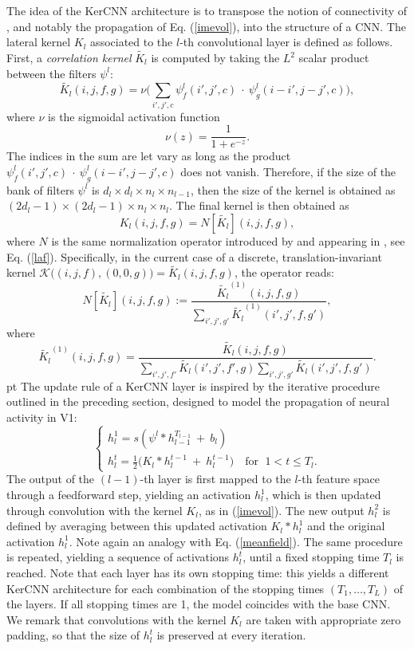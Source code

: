 \documentclass[11pt,oneside,reqno]{amsart}
\begin{document}
 The idea of the KerCNN architecture is to transpose the notion of connectivity of \citet{neuro,metric}, and notably the propagation of Eq. (\ref{imevol}), into the structure of a CNN. The lateral kernel $K_l$ associated to the $l$-th convolutional layer is defined as follows. First, a \emph{correlation kernel} $\tilde{K_l}$ is computed by taking the $L^2$ scalar product between the filters $\psi^l$:
 \begin{equation}\label{initK}
  \tilde{K_l}(i,j,f,g) = \nu\Big(\sum_{i',j',c} \psi^l_f(i',j',c)\: \cdot \: \psi^l_g(i-i',j-j',c)\Big),
 \end{equation}
 where $\nu$ is the sigmoidal activation function
 \[\nu(z) = \frac{1}{1+e^{-z}}.\]
 The indices in the sum are let vary as long as the product $\psi^l_f(i',j',c)\: \cdot \: \psi^l_g(i-i',j-j',c)$ does not vanish. Therefore, if the size of the bank of filters $\psi^l$ is $d_l \times d_l \times n_l \times n_{l-1}$, then the size of the kernel is obtained as $(2d_l-1)\times(2d_l-1)\times n_l \times n_l$.
 The final kernel is then obtained as
 \[K_l(i,j,f,g) = N[\tilde{K_l}](i,j,f,g),\]
 where $N$ is the same normalization operator introduced by \citet{coiflaf} and appearing in \citet{neuro}, see Eq. (\ref{laf}). Specifically, in the current case of a discrete, translation-invariant kernel $\mathcal{K}\big( (i,j,f),(0,0,g) \big) = \tilde{K_l}(i,j,f,g)$, the operator reads:
 \[N[\tilde{K_l}](i,j,f,g) := \frac{\tilde{K_l}^{(1)}(i,j,f,g)}{\sum_{i',j',g'} \tilde{K_l}^{(1)}(i',j',f,g')},\]
  where
  \[\tilde{K_l}^{(1)}(i,j,f,g) = \frac{\tilde{K_l}(i,j,f,g)}{\sum_{i',j',f'} \tilde{K_l}(i',j',f',g) \sum_{i',j',g'} \tilde{K_l}(i',j',f,g')}.\]
   pt
  The update rule of a KerCNN layer is inspired by the iterative procedure outlined in the preceding section, designed to model the propagation of neural activity in V1:
  \begin{equation}\label{kcnnrule} \begin{cases}h_l^1 = s(\psi^l \ast h_{l-1}^{T_{l-1}} \:+\: b_l)\\
 h_l^t = \frac{1}{2}\Big(K_l \ast h_l^{t-1} \:+\: h_l^{t-1} \Big) \quad \text{for }\; 1 < t \leq T_l. \end{cases}\end{equation}
 The output of the $(l-1)$-th layer is first mapped to the $l$-th feature space through a feedforward step, yielding an activation $h_l^1$, which is then updated through convolution with the kernel $K_l$, as in (\ref{imevol}). The new output $h_l^2$ is defined by averaging between this updated activation $K_l \ast h_l^1$ and the original activation $h_l^1$. Note again an analogy with Eq. (\ref{meanfield}). The same procedure is repeated, yielding a sequence of activations $h_l^t$, until a fixed stopping time $T_l$ is reached. Note that each layer has its own stopping time: this yields a different KerCNN architecture for each combination of the stopping times $(T_1,\ldots,T_L)$ of the layers. If all stopping times are 1, the model coincides with the base CNN. We remark that convolutions with the kernel $K_l$ are taken with appropriate zero padding, so that the size of $h_l^{t}$ is preserved at every iteration. \\
\end{document}
